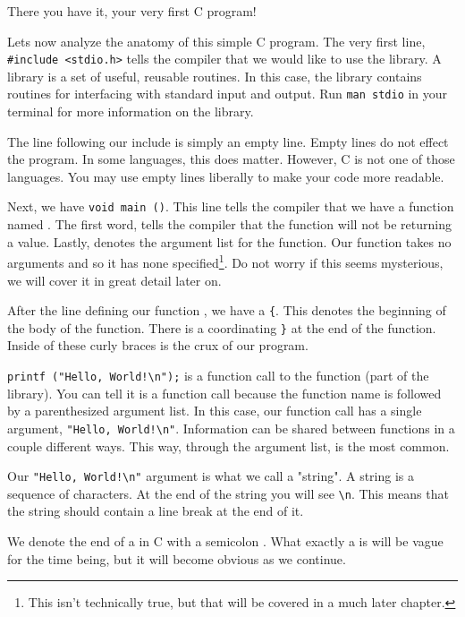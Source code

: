 There you have it, your very first C program!

Lets now analyze the anatomy of this simple C program. The very first line,
\verb|#include <stdio.h>| tells the compiler that we would like to use the
 library. A library is a set of useful, reusable routines. In this
case, the  library contains routines for interfacing with standard
input and output. Run \verb|man stdio| in your terminal for more information on
the  library.

The line following our include is simply an empty line. Empty lines do not
effect the program. In some languages, this does matter. However, C is not one
of those languages. You may use empty lines liberally to make your code more
readable.

Next, we have \verb|void main ()|. This line tells the compiler that we have a
function named . The first word,  tells the compiler
that the function will not be returning a value. Lastly, \ident{()} denotes the
argument list for the function. Our  function takes no arguments
and so it has none specified\footnote[1]{This isn't technically true, but that
will be covered in a much later chapter.}. Do not worry if this seems
mysterious, we will cover it in great detail later on.

After the line defining our function , we have a \verb|{|. This
denotes the beginning of the body of the function. There is a coordinating
\verb|}| at the end of the function. Inside of these curly braces is the crux
of our program.

\verb|printf ("Hello, World!\n");| is a function call to the 
function (part of the  library). You can tell it is a function
call because the function name is followed by a parenthesized argument list.
In this case, our function call has a single argument,
\verb|"Hello, World!\n"|. Information can be shared between functions in
a couple different ways. This way, through the argument list, is the most
common.

Our \verb|"Hello, World!\n"| argument is what we call a "string". A string
is a sequence of characters. At the end of the string you will see \verb|\n|.
This means that the string should contain a line break at the end of it.

We denote the end of a  in C with a semicolon \ident{;}.
What exactly a  is will be vague for the time being, but it
will become obvious as we continue.

